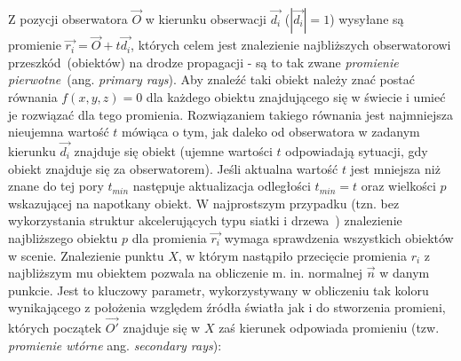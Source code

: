 Z pozycji obserwatora $\vec{O}$ w kierunku obserwacji $\vec{d_i}$ ($|\vec{d_i}| = 1$) wysyłane są promienie $\vec{r_i} = \vec{O} + t\vec{d_i}$, których celem jest znalezienie najbliższych obserwatorowi przeszkód~(obiektów) na drodze propagacji - są to tak zwane \textit{promienie pierwotne}~(ang. \textit{primary rays}). Aby znaleźć taki obiekt należy znać postać równania $f(x, y, z) = 0$ dla każdego obiektu znajdującego się w świecie i umieć je rozwiązać dla tego promienia. Rozwiązaniem takiego równania jest najmniejsza nieujemna wartość $t$ mówiąca o tym, jak daleko od obserwatora w zadanym kierunku $\vec{d_i}$ znajduje się obiekt (ujemne wartości $t$ odpowiadają sytuacji, gdy obiekt znajduje się za obserwatorem). Jeśli aktualna wartość $t$ jest mniejsza niż znane do tej pory $t_{min}$ następuje aktualizacja odległości $t_{min} = t$ oraz wielkości $p$ wskazującej na napotkany obiekt. W najprostszym przypadku (tzn. bez wykorzystania struktur akcelerujących typu siatki i drzewa~\cite{VINKLER_PHD}) znalezienie najbliższego obiektu $p$ dla promienia $\vec{r_i}$ wymaga sprawdzenia wszystkich obiektów w scenie.
Znalezienie punktu $X$, w którym nastąpiło przecięcie promienia $r_i$ z najbliższym mu obiektem pozwala na obliczenie m. in. normalnej $\vec{n}$ w danym punkcie. Jest to kluczowy parametr, wykorzystywany w obliczeniu tak koloru wynikającego z położenia względem źródła światła jak i do stworzenia promieni, których początek $\vec{O'}$ znajduje się w $X$ zaś kierunek odpowiada promieniu (tzw. \textit{promienie wtórne} ang. \textit{secondary rays}):
